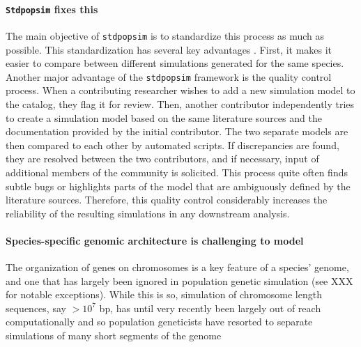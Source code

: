 \documentclass[hidelinks]{article}
\newcommand{\Stdpopsim}{\texttt{Stdpopsim}\xspace}
\newcommand{\stdpopsim}{\texttt{stdpopsim}\xspace}
\begin{document}
\paragraph*{\Stdpopsim fixes this}
The main objective of \stdpopsim is to standardize this process as much as possible.
This standardization has several key advantages \citep{Adrion2020}. First, it makes it easier to compare between different
simulations generated for the same species. Another major advantage of the
\stdpopsim framework is the quality control process.
When a contributing researcher wishes to add a new simulation model to the catalog,
they flag it for review. Then, another contributor independently tries to create a simulation model based on the same literature sources and the documentation provided by the initial contributor. The two separate models are then
compared to each other by automated scripts. If discrepancies are found, they
are resolved between the two contributors, and if necessary, input of additional members of the community is solicited. This process quite often
finds subtle bugs  \citep{Ragsdale2020} or highlights parts of the model that are
ambiguously defined by the literature sources. 
Therefore, this quality control considerably increases the reliability of the
resulting simulations in any downstream analysis.


\paragraph*{%
  \textbf{Species-specific genomic architecture is challenging to model}}
The organization of genes on chromosomes is a key feature of a species' genome,
and one that has largely been ignored in population genetic simulation (see XXX for notable exceptions).
While this is so, simulation of chromosome length sequences, say $ > 10^7$ bp, 
has until very recently been largely out of reach computationally
and so population geneticists have resorted to separate simulations of many short segments
of the genome
   
\end{document}
